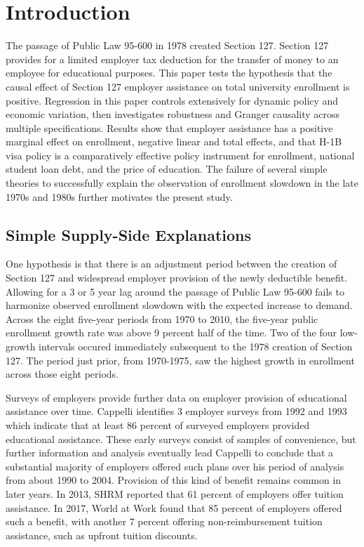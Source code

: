 \documentclass[review]{elsarticle}
\begin{document}
\pagebreak
\linenumbers

\section{Introduction}
The passage of Public Law 95-600 in 1978 created Section 127\cite{plaw95_600_1978}.
Section 127 provides for a limited employer tax deduction for the transfer of money to an employee for educational purposes.
This paper tests the hypothesis that the causal effect of Section 127 employer assistance on total university enrollment is positive.
Regression in this paper controls extensively for dynamic policy and economic variation,
then investigates robustness and Granger causality across multiple specifications.
Results show that employer assistance has a positive marginal effect on enrollment,
negative linear and total effects,
and that H-1B visa policy is a comparatively effective policy instrument for enrollment,
national student loan debt, and the price of education.
The failure of several simple theories to successfully explain the observation of enrollment slowdown in the late 1970s and 1980s further motivates the present study.

\subsection{Simple Supply-Side Explanations}
One hypothesis is that there is an adjustment period between the creation of Section 127 and widespread employer provision of the newly deductible benefit.
Allowing for a 3 or 5 year lag around the passage of Public Law 95-600 fails to harmonize observed enrollment slowdown with the expected increase to demand.
Across the eight five-year periods from 1970 to 2010, the five-year public enrollment growth rate was above 9 percent half of the time.
Two of the four low-growth intervals occured immediately subsequent to the 1978 creation of Section 127.
The period just prior, from 1970-1975, saw the highest growth in enrollment across those eight periods.

Surveys of employers provide further data on employer provision of educational assistance over time.
Cappelli identifies 3 employer surveys from 1992 and 1993 which indicate that at least 86 percent of surveyed employers provided educational assistance\cite{cappelli2004employers}.
These early surveys consist of samples of convenience,
but further information and analysis eventually lead Cappelli to conclude that a substantial majority of employers offered such plans over his period of analysis from about 1990 to 2004.
Provision of this kind of benefit remains common in later years.
In 2013, SHRM reported that 61 percent of employers offer tuition assistance\cite{cherry2014rejuvenating}.
In 2017, World at Work found that 85 percent of employers offered such a benefit,
with another 7 percent offering non-reimbursement tuition assistance, such as upfront tuition discounts\cite{talentculture_2018}.
\end{document}
